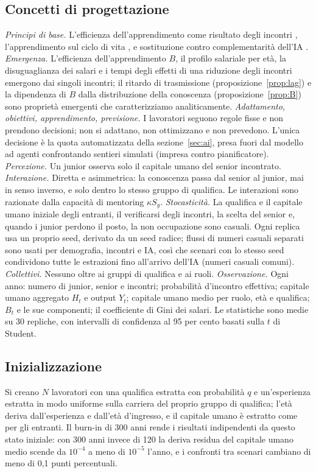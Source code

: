 \documentclass[preprint,12pt,authoryear]{elsarticle}
\begin{document}
\subsection{Concetti di progettazione}
\emph{Principi di base.} L'efficienza dell'apprendimento come risultato degli incontri \citep{LucasMoll2014}, l'apprendimento sul ciclo di vita \citep{BenPorath1967}, e sostituzione contro complementarità dell'IA \citep{Acemoglu2024,Ide2026}.
\emph{Emergenza.} L'efficienza dell'apprendimento $B$, il profilo salariale per età, la disuguaglianza dei salari e i tempi degli effetti di una riduzione degli incontri emergono dai singoli incontri; il ritardo di trasmissione (proposizione~\ref{prop:lag}) e la dipendenza di $B$ dalla distribuzione della conoscenza (proposizione~\ref{prop:B}) sono proprietà emergenti che caratterizziamo analiticamente.
\emph{Adattamento, obiettivi, apprendimento, previsione.} I lavoratori seguono regole fisse e non prendono decisioni; non si adattano, non ottimizzano e non prevedono. L'unica decisione è la quota automatizzata della sezione~\ref{sec:ai}, presa fuori dal modello ad agenti confrontando sentieri simulati (impresa contro pianificatore).
\emph{Percezione.} Un junior osserva solo il capitale umano del senior incontrato.
\emph{Interazione.} Diretta e asimmetrica: la conoscenza passa dal senior al junior, mai in senso inverso, e solo dentro lo stesso gruppo di qualifica. Le interazioni sono razionate dalla capacità di mentoring $\kappa S_g$.
\emph{Stocasticità.} La qualifica e il capitale umano iniziale degli entranti, il verificarsi degli incontri, la scelta del senior e, quando i junior perdono il posto, la non occupazione sono casuali. Ogni replica usa un proprio seed, derivato da un seed radice; flussi di numeri casuali separati sono usati per demografia, incontri e IA, così che scenari con lo stesso seed condividono tutte le estrazioni fino all'arrivo dell'IA (numeri casuali comuni).
\emph{Collettivi.} Nessuno oltre ai gruppi di qualifica e ai ruoli.
\emph{Osservazione.} Ogni anno: numero di junior, senior e incontri; probabilità d'incontro effettiva; capitale umano aggregato $H_t$ e output $Y_t$; capitale umano medio per ruolo, età e qualifica; $B_t$ e le sue componenti; il coefficiente di Gini dei salari. Le statistiche sono medie su 30 repliche, con intervalli di confidenza al 95 per cento basati sulla $t$ di Student.

\subsection{Inizializzazione}
Si creano $N$ lavoratori con una qualifica estratta con probabilità $q$ e un'esperienza estratta in modo uniforme sulla carriera del proprio gruppo di qualifica; l'età deriva dall'esperienza e dall'età d'ingresso, e il capitale umano è estratto come per gli entranti. Il burn-in di 300 anni rende i risultati indipendenti da questo stato iniziale: con 300 anni invece di 120 la deriva residua del capitale umano medio scende da $10^{-4}$ a meno di $10^{-5}$ l'anno, e i confronti tra scenari cambiano di meno di 0,1 punti percentuali.
\end{document}
